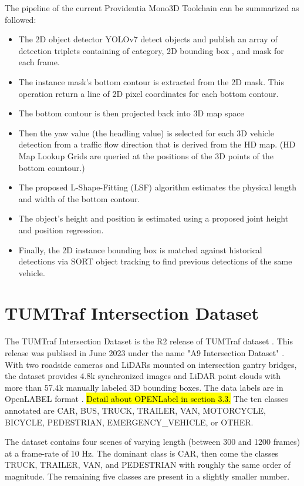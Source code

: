 The pipeline of the current Providentia Mono3D Toolchain can be summarized as followed: 
\begin{itemize}
	\item The 2D object detector YOLOv7 detect objects and publish an array of detection triplets containing of category, 2D bounding box , and mask for each frame. 
	\item The instance mask's bottom contour is extracted from the 2D mask. This operation return a line of 2D pixel coordinates for each bottom contour. 
	\item The bottom contour is then projected back into 3D map space 
	\item Then the yaw value (the headling value) is selected for each 3D vehicle detection from a traffic flow direction that is derived from the HD map. (HD Map Lookup Grids are queried at the positions of the 3D points of the bottom countour.)
	\item The proposed L-Shape-Fitting (LSF) algorithm estimates the physical length and width of the bottom contour. 
	\item The object's height and position is estimated using a proposed joint height and position regression. 
	\item Finally, the 2D instance bounding box is matched against historical detections via SORT object tracking to find previous detections of the same vehicle. 
\end{itemize}


\section{TUMTraf Intersection Dataset}

The TUMTraf Intersection Dataset is the R2 release of TUMTraf dataset \cite{a9dataset}. This release was publised in June 2023 under the name "A9 Intersection Dataset" \cite{zimmer2023a9}. With two roadside cameras and LiDARs mounted on intersection gantry bridges, the dataset provides 4.8k synchronized images and LiDAR point clouds with more than 57.4k manually labeled 3D bounding boxes. The data labels are in OpenLABEL format \cite{openlabel}. \hl{Detail about OPENLabel in section 3.3.} The ten classes annotated are CAR, BUS, TRUCK, TRAILER, VAN, MOTORCYCLE, BICYCLE, PEDESTRIAN, EMERGENCY\_VEHICLE, or OTHER. 

The dataset contains four scenes of varying length (between 300 and 1200 frames) at a frame-rate of 10 Hz. The dominant class is CAR, then come the classes TRUCK, TRAILER, VAN, and PEDESTRIAN with roughly the same order of magnitude. The remaining five classes are present in a slightly smaller number. 

